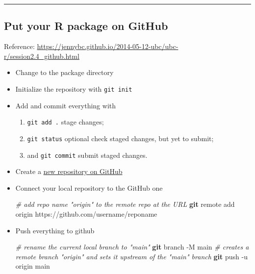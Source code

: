 \documentclass[
  a4paper,
  twoside,
  openright]{book}
\newenvironment{Shaded}{\begin{snugshade}}{\end{snugshade}}
\newcommand{\AttributeTok}[1]{\textcolor[rgb]{0.13,0.29,0.53}{#1}}
\newcommand{\CommentTok}[1]{\textcolor[rgb]{0.56,0.35,0.01}{\textit{#1}}}
\newcommand{\FunctionTok}[1]{\textcolor[rgb]{0.13,0.29,0.53}{\textbf{#1}}}
\newcommand{\NormalTok}[1]{#1}
\providecommand{\tightlist}{%
  \setlength{\itemsep}{0pt}\setlength{\parskip}{0pt}}
\theoremstyle{definition}
\theoremstyle{definition}
\theoremstyle{definition}
\theoremstyle{definition}
\theoremstyle{remark}
\begin{document}
\begin{center}\rule{0.5\linewidth}{0.5pt}\end{center}

\subsection{Put your R package on GitHub}\label{put-your-r-package-on-github}

Reference: \url{https://jennybc.github.io/2014-05-12-ubc/ubc-r/session2.4_github.html}

\begin{itemize}
\item
  Change to the package directory
\item
  Initialize the repository with \texttt{git\ init}
\item
  Add and commit everything with

  \begin{enumerate}
  \def\labelenumi{\arabic{enumi}.}
  \tightlist
  \item
    \texttt{git\ add\ .} stage changes;
  \item
    \texttt{git\ status} optional check staged changes, but yet to submit;
  \item
    and \texttt{git\ commit} submit staged changes.
  \end{enumerate}
\item
  Create a \href{https://github.com/new}{new repository on GitHub}
\item
  Connect your local repository to the GitHub one

\begin{Shaded}
\begin{Highlighting}[]
\CommentTok{\# add repo name "origin" to the remote repo at the URL}
\FunctionTok{git}\NormalTok{ remote add origin https://github.com/username/reponame}
\end{Highlighting}
\end{Shaded}
\item
  Push everything to github

\begin{Shaded}
\begin{Highlighting}[]
\CommentTok{\# rename the current local branch to "main"}
\FunctionTok{git}\NormalTok{ branch }\AttributeTok{{-}M}\NormalTok{ main}
\CommentTok{\# creates a remote branch "origin" and sets it upstream of the "main" branch}
\FunctionTok{git}\NormalTok{ push }\AttributeTok{{-}u}\NormalTok{ origin main}
\end{Highlighting}
\end{Shaded}
\end{itemize}
\end{document}
